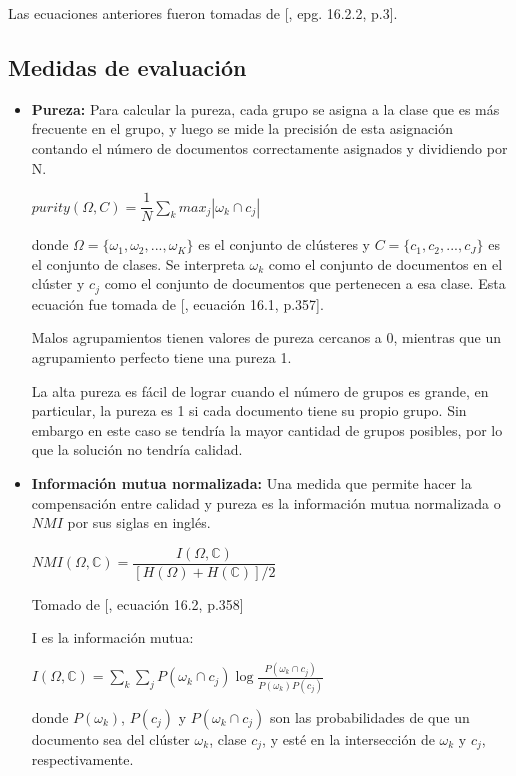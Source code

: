 \documentclass{llncs}
\begin{document}
Las ecuaciones anteriores fueron tomadas de [\cite{B3}, epg. 16.2.2, p.3].

\subsection{Medidas de evaluaci\'on} 
	\normalsize
	\begin{itemize}
	\item \textbf{Pureza:} Para calcular la pureza, cada grupo se asigna a la clase que es más frecuente en el grupo, y luego se mide la precisión de esta asignación contando el número de documentos correctamente asignados y dividiendo por N.
	
	\begin{center}
		$purity(\Omega, C) = \dfrac{1}{N} \sum_{k}max_{j} |\omega_{k} \cap c_{j}| $ 
	\end{center}
	
	donde $ \Omega = \{\omega_{1}, \omega_{2}, ... , \omega_{K}\} $ es el conjunto de cl\'usteres y $ C = \{c_{1}, c_{2}, ... , c_{J}\} $ es el conjunto de clases. Se interpreta $ \omega_{k} $ como el conjunto de documentos en el cl\'uster y $ c_{j} $ como el conjunto de documentos que pertenecen a esa clase. Esta ecuaci\'on fue tomada de [\cite{B1}, ecuaci\'on 16.1, p.357].
	
	Malos agrupamientos tienen valores de pureza cercanos a 0, mientras que un agrupamiento perfecto tiene una pureza 1.
	
	La alta pureza es fácil de lograr cuando el número de grupos es grande, en particular, la pureza es 1 si cada documento tiene su propio grupo. Sin embargo en este caso se tendr\'ia la mayor cantidad de grupos posibles, por lo que la soluci\'on no tendr\'ia calidad.
	
	\vspace{1em}
	\item \textbf{Información mutua normalizada:} Una medida que permite hacer la compensaci\'on entre calidad y pureza es la información mutua normalizada o $ NMI $ por sus siglas en ingl\'es.
	
	\begin{center}
		$ NMI(\Omega, \mathbb{C}) = \dfrac{I(\Omega, \mathbb{C})}{[H(\Omega) + H(\mathbb{C})]/2}
		$ 
	\end{center}
	
	Tomado de [\cite{B1}, ecuaci\'on 16.2, p.358]
	
	I es la informaci\'on mutua:
	\begin{center}
		$ I(\Omega, \mathbb{C}) = \sum_{k}\sum_{j}P(\omega_{k} \cap c_{j})\log\frac{P(\omega_{k} \cap c_{j})}{P(\omega_{k})P(c_{j})} $
	\end{center}
	donde $ P(\omega_{k}) $, $ P(c_{j}) $ y $ P(\omega_{k} \cap c_{j}) $ son las probabilidades de que un documento sea del cl\'uster $ \omega_{k} $, clase $ c_{j} $, y est\'e en la intersección de $ \omega_{k} $ y $ c_{j} $, respectivamente.
	

\end{itemize}
\end{document}
